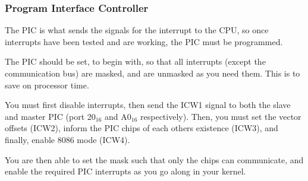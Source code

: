 \documentclass{article}
\begin{document}
\subsubsection{Program Interface Controller}

The PIC is what sends the signals for the interrupt to the CPU, so once
interrupts have been tested and are working, the PIC must be programmed.

The PIC should be set, to begin with, so that all interrupts (except the
communication bus) are masked, and are unmasked as you need them. This is
to save on processor time.

You must first disable interrupts, then send the ICW1 signal to both the
slave and master PIC (port 20$_{16}$ and A0$_{16}$ respectively). Then, you
must set the vector offsets (ICW2), inform the PIC chips of each others
existence (ICW3), and finally, enable 8086 mode (ICW4)\cite{lidt}.

You are then able to set the mask such that only the chips can communicate,
and enable the required PIC interrupts as you go along in your kernel.
\end{document}
